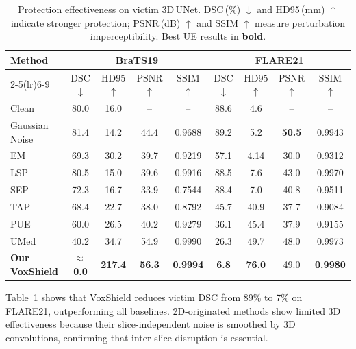 \documentclass[runningheads]{llncs}
\begin{document}
\begin{table}[t]
\centering
\caption{Protection effectiveness on victim 3D\,UNet.
  DSC\,(\%) $\downarrow$ and HD95\,(mm) $\uparrow$ indicate stronger
  protection; PSNR\,(dB) $\uparrow$ and SSIM $\uparrow$ measure
  perturbation imperceptibility.
  Best UE results in \textbf{bold}.}\label{tab:main}
\setlength{\tabcolsep}{3pt}
\footnotesize
\begin{tabular}{l cccc cccc}
\toprule
\multirow{2}{*}{Method}
  & \multicolumn{4}{c}{BraTS19}
  & \multicolumn{4}{c}{FLARE21} \\
\cmidrule(lr){2-5}\cmidrule(lr){6-9}
  & DSC$\downarrow$ & HD95$\uparrow$
  & PSNR$\uparrow$ & SSIM$\uparrow$
  & DSC$\downarrow$ & HD95$\uparrow$
  & PSNR$\uparrow$ & SSIM$\uparrow$ \\
\midrule
Clean
  & 80.0 &  16.0 & --   & --
  & 88.6 &  4.6 & --   & -- \\
Gaussian Noise
  & 81.4 &  14.2 & 44.4   & 0.9688
  & 89.2 &  5.2 & \textbf{50.5}   & 0.9943 \\
EM~\cite{huang2021unlearnable}
  & 69.3 & 30.2 & 39.7   & 0.9219
  & 57.1 & 4.14 & 30.0   & 0.9312 \\
LSP~\cite{yu2022availability}
  & 80.5 & 15.0 & 39.6   & 0.9916
  & 88.5 & 7.6 & 43.0   & 0.9970 \\
SEP~\cite{liu2023stable}
  & 72.3 &  16.7 & 33.9   & 0.7544
  & 88.4 &  7.0 & 40.8   & 0.9511 \\
TAP~\cite{fowl2021adversarial}
  & 68.4 &  22.7 & 38.0   & 0.8792
  & 45.7 &  40.9 & 37.7   & 0.9084 \\
PUE~\cite{wang2025provably}
  & 60.0 &  26.5 & 40.2   & 0.9279
  & 36.1 &  45.4 & 37.9   & 0.9155 \\
UMed~\cite{lin2024safeguarding}
  & 40.2 &  34.7 & 54.9   & 0.9990
  & 26.3 &  49.7 & 48.0   & 0.9973 \\
\midrule
\textbf{Our VoxShield}
  & \textbf{$\approx$\,0.0} & \textbf{217.4} & \textbf{56.3} & \textbf{0.9994}
  & \textbf{6.8} & \textbf{76.0}    & 49.0 & \textbf{0.9980} \\
\bottomrule
\end{tabular}
\end{table}

Table~\ref{tab:main} shows that VoxShield reduces victim DSC from 89\% to 7\% on FLARE21, outperforming all baselines. 2D-originated methods show limited 3D effectiveness because their slice-independent noise is smoothed by 3D convolutions, confirming that inter-slice disruption is essential.
\end{document}
